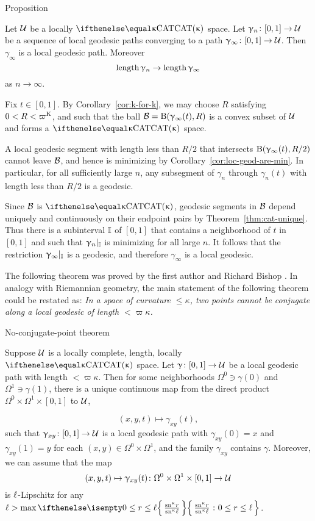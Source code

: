 \begin{thm}{Proposition}\label{prop:geo-complete}
{\sloppy 
Let $\mathcal{U}$ be a locally $\CAT\kappa$ space.
 Let $\gamma_n\:[0,1]\to\spc{U}$ be a sequence of local geodesic paths converging to a path $\gamma_\infty\:[0,1]\to\spc{U}$.
Then $\gamma_\infty$ is a local geodesic path.
Moreover 
\[\length\gamma_n\to\length\gamma_\infty\]
as $n\to\infty$.

}
\end{thm}

Fix $t\in[0,1]$.
By Corollary~\ref{cor:k-for-k}, we may choose $R$ satisfying $0<R<\varpi\Kappa$,
and such that
the ball $\mathcal{B}=\mathrm{B}{}(\upgamma_\infty(t),R)$ is a convex subset of $\mathcal{U}$ and forms a $\CAT\kappa$ space.

A local geodesic segment  with length less than $R/2$ that intersects $\mathrm{B}{}(\upgamma_\infty(t),R/2)$ cannot leave $\mathcal{B}$, and hence  is  minimizing by Corollary~\ref{cor:loc-geod-are-min}.
In particular, for all sufficiently large $n$, any subsegment of $\gamma_n$ through $\gamma_n(t)$  with length less than $R/2$ is a geodesic.


Since $\mathcal{B}$ is $\CAT\kappa$, geodesic segments in $\mathcal{B}$ depend uniquely and continuously on their endpoint pairs by Theorem~\ref{thm:cat-unique}.  
Thus there is a subinterval $\mathbb{I}$ of $[0,1]$
that contains a neighborhood of $t$ in $[0,1]$
and such that $\upgamma_n|_{\mathbb{I}}$ is minimizing for all large $n$.
It follows that the restriction $\upgamma_\infty|_{\mathbb{I}}$ is a geodesic,
and therefore $\gamma_\infty$ is a local geodesic.
\qeds


The following theorem was proved by the first author and Richard Bishop \cite{alexander-bishop:h-c}.
In analogy with Riemannian geometry, the main statement of the following theorem could be restated as: 
\emph{In a space of curvature $\le\kappa$, two points cannot be conjugate along a local geodesic of length $<\varpi\kappa$.}


\begin{thm}{No-conjugate-point theorem}
\label{thm:no-conj-pt}{\sloppy 
Suppose $\mathcal{U}$ is a locally complete, length, locally $\CAT\kappa$ space.
Let $\gamma\:[0,1]\to\spc{U}$ be a local geodesic path with length $<\varpi\kappa$.
Then for some neighborhoods $\Omega^0\ni \gamma(0)$ and $\Omega^1\ni\gamma(1)$, 
there is a unique continuous map from the direct product $\Omega^0\times \Omega^1\times[0,1]$ to $\mathcal{U}$, 

\[(x,y,t)\mapsto\gamma_{x y}(t),\]  
such that 
$\gamma_{x y}\:[0,1]\to\spc{U}$ is a local geodesic path with 
$\gamma_{x y}(0)=x$ and 
$\gamma_{x y}(1)=y$ for each $(x,y)\in\Omega^0\times\Omega^1$,
and the family $\gamma_{x y}$ contains $\gamma$.
Moreover, we can assume that the map 
\[(x,y,t)\mapsto\gamma_{x y}(t)\:\Omega^0\times\Omega^1\times[0,1]\to\spc{U}\] 
is ${\ell}$-Lipschitz
for any
$\Lip>\max\set{\tfrac{\sn\kappa r}{\sn\kappa \ell}}{0\le r\le \ell}$.

}
\end{thm}

